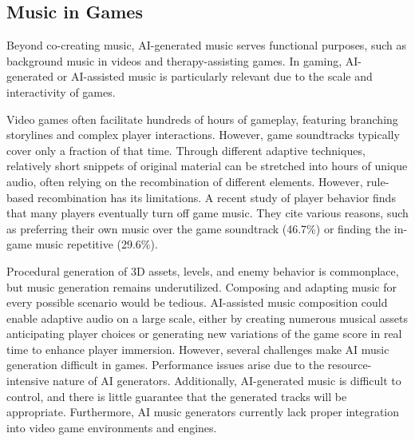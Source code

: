 \subsection{Music in Games}
Beyond co-creating music, AI-generated music serves functional purposes, such as background music in videos and therapy-assisting games. In gaming, AI-generated or AI-assisted music is particularly relevant due to the scale and interactivity of games.

Video games often facilitate hundreds of hours of gameplay, featuring branching storylines and complex player interactions. However, game soundtracks typically cover only a fraction of that time\cite{Plut_Pasquier_2020, Worrall_Collins_2024}. Through different adaptive techniques, relatively short snippets of original material can be stretched into hours of unique audio, often relying on the recombination of different elements. However, rule-based recombination has its limitations. A recent study of player behavior \cite{Rogers_Weber_2019} finds that many players eventually turn off game music. They cite various reasons, such as preferring their own music over the game soundtrack (46.7\%) or finding the in-game music repetitive (29.6\%).

Procedural generation of 3D assets, levels, and enemy behavior is commonplace, but music generation remains underutilized. Composing and adapting music for every possible scenario would be tedious. AI-assisted music composition could enable adaptive audio on a large scale, either by creating numerous musical assets anticipating player choices or generating new variations of the game score in real time to enhance player immersion. However, several challenges make AI music generation difficult in games. Performance issues arise due to the resource-intensive nature of AI generators. Additionally, AI-generated music is difficult to control, and there is little guarantee that the generated tracks will be appropriate\cite{Plut_Pasquier_2020}. Furthermore, AI music generators currently lack proper integration into video game environments and engines\cite{Worrall_Collins_2024}.

